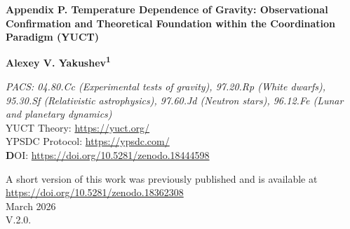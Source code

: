 \documentclass[12pt]{article}
\theoremstyle{remark}
\begin{document}
	
	\begin{titlepage}
		\begin{center}
			\vspace*{0cm}
			
			\Huge\textbf{Appendix P. Temperature Dependence of Gravity: Observational Confirmation and Theoretical Foundation within the Coordination Paradigm (YUCT)}
			
						
			\vspace{2.3cm}
			
			\Large\textbf{Alexey V. Yakushev\textsuperscript{1}}
			
			\vspace{0.2cm}

			
			\vspace{1.3cm}
			\large\textit{PACS: 04.80.Cc (Experimental tests of gravity), 97.20.Rp (White dwarfs), 95.30.Sf (Relativistic astrophysics), 97.60.Jd (Neutron stars), 96.12.Fe (Lunar and planetary dynamics)} \\
			
	YUCT Theory: \url{https://yuct.org/}\\
YPSDC Protocol: \url{https://ypsdc.com/}\\


\vspace{2cm}
\textbf DOI: \url{https://doi.org/10.5281/zenodo.18444598}\\

\vspace{1cm}

\vspace{0cm}
\large 
A short version of this work was previously published and is available at\\ \url{https://doi.org/10.5281/zenodo.18362308}\\
\vspace{1cm}
March 2026 \\ \large V.2.0.
			

\end{center}
\end{titlepage}
\end{document}

